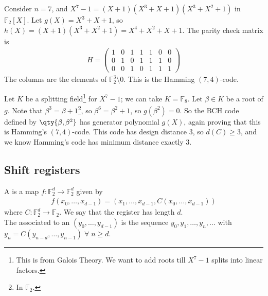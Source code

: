 \begin{example}

    Consider $n = 7$, and $X^7 - 1 = (X + 1)(X^3 + X + 1)(X^3 + X^2 + 1)$ in $\mathbb F_2[X]$.
    Let $g(X) = X^3 + X + 1$, so $h(X) = (X + 1)(X^3 + X^2 + 1) = X^4 + X^2 + X + 1$.
    The parity check matrix is
    \begin{align*}
        H = \begin{pmatrix}
            1 & 0 & 1 & 1 & 1 & 0 & 0 \\
            0 & 1 & 0 & 1 & 1 & 1 & 0 \\
            0 & 0 & 1 & 0 & 1 & 1 & 1
        \end{pmatrix}
    \end{align*}
    The columns are the elements of $\mathbb F_2^3 \setminus \qty{0}$.
    This is the Hamming $(7,4)$-code.

    Let $K$ be a splitting field\footnote{This is from Galois Theory. We want to add roots till $X^7 - 1$ splits into linear factors.} for $X^7 - 1$; we can take $K = \mathbb F_8$.
    Let $\beta \in K$ be a root of $g$.
    Note that $\beta^3 = \beta + 1$\footnote{In $\mathbb{F}_2$.}, so $\beta^6 = \beta^2 + 1$, so $g(\beta^2) = 0$. %
    So the BCH code defined by $\qty{\beta, \beta^2}$ has generator polynomial $g(X)$, again proving that this is Hamming's $(7,4)$-code.
    This code has design distance $3$, so $d(C) \geq 3$, and we know Hamming's code has minimum distance exactly 3.
\end{example}

\subsection{Shift registers}

\begin{definition}
    A  is a map $f \colon \mathbb F_2^d \to \mathbb F_2^d$ given by
    \begin{align*}
        f(x_0, \dots, x_{d-1}) = (x_1, \dots, x_{d-1}, C(x_0, \dots, x_{d-1}))
    \end{align*}
    where $C \colon \mathbb F_2^d \to \mathbb F_2$.
    We say that the register has length $d$. \\
    The  associated to an  $(y_0, \dots, y_{d-1})$ is the sequence $y_0, y_1, \dots, y_n, \dots$ with $y_n = C(y_{n-d}, \dots, y_{n-1}) \; \forall \; n \geq d$.
\end{definition}

